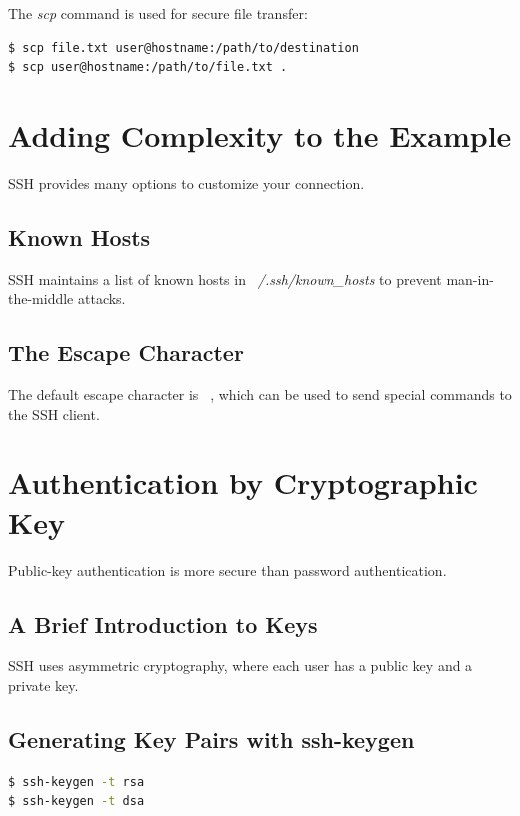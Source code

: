 \documentclass[12pt]{book}
\begin{document}
The \textit{scp} command is used for secure file transfer:

\begin{lstlisting}[language=bash]
$ scp file.txt user@hostname:/path/to/destination
$ scp user@hostname:/path/to/file.txt .
\end{lstlisting}

\section{Adding Complexity to the Example}

SSH provides many options to customize your connection.

\subsection{Known Hosts}

SSH maintains a list of known hosts in \textit{~/.ssh/known\_hosts} to prevent man-in-the-middle attacks.

\subsection{The Escape Character}

The default escape character is \textit{~}, which can be used to send special commands to the SSH client.

\section{Authentication by Cryptographic Key}

Public-key authentication is more secure than password authentication.

\subsection{A Brief Introduction to Keys}

SSH uses asymmetric cryptography, where each user has a public key and a private key.

\subsection{Generating Key Pairs with ssh-keygen}

\begin{lstlisting}[language=bash]
$ ssh-keygen -t rsa
$ ssh-keygen -t dsa
\end{lstlisting}
\end{document}
